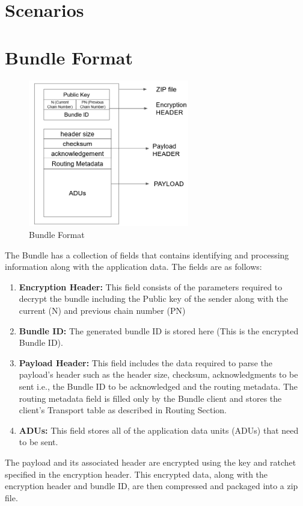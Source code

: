 \section{Scenarios}

\section{Bundle Format}
\begin{figure}[ht!]
\centering
\includegraphics[width= 70mm]{./images/Bundle Header.png}
\caption{Bundle Format}
\end{figure}

The Bundle has a collection of fields that contains identifying and processing information along with the application data. The fields are as follows:
\begin{enumerate}
    \item \textbf{Encryption Header:} This field consists of the parameters required to decrypt the bundle including the Public key of the sender along with the current (N) and previous chain number (PN)
    \item \textbf{Bundle ID:} The generated bundle ID is stored here (This is the encrypted Bundle ID).
    \item \textbf{Payload Header:} This field includes the data required to parse the payload's header such as the header size, checksum, acknowledgments to be sent i.e., the Bundle ID to be acknowledged and the routing metadata. The routing metadata field is filled only by the Bundle client and stores the client's Transport table as described in Routing Section.
    \item \textbf{ADUs:} This field stores all of the application data units (ADUs) that need to be sent.
\end{enumerate}

The payload and its associated header are encrypted using the key and ratchet specified in the encryption header. This encrypted data, along with the encryption header and bundle ID, are then compressed and packaged into a zip file.
